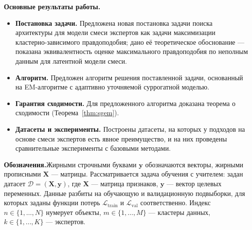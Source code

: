 \medskip
\textbf{Основные результаты работы.}
\begin{itemize}
    \item \textbf{Постановка задачи.} Предложена новая постановка задачи
    поиска архитектуры для модели смеси экспертов как задачи максимизации
    кластерно-зависимого правдоподобия; дано её теоретическое
    обоснование --- показана эквивалентность оценке максимального
    правдоподобия по неполным данным для латентной модели смеси.
    \item \textbf{Алгоритм.} Предложен алгоритм решения поставленной
    задачи, основанный на EM-алгоритме с адаптивно уточняемой
    суррогатной моделью.
    \item \textbf{Гарантия сходимости.} Для предложенного алгоритма
    доказана теорема о сходимости (Теорема~\ref{thm:sgem}).
    \item \textbf{Датасеты и эксперименты.} Построены датасеты, на
    которых у подходов на основе смеси экспертов есть явное преимущество,
    и на них проведены сравнительные эксперименты с базовыми методами.
\end{itemize}

\medskip
\textbf{Обозначения.}\quad Жирными строчными буквами $\mathbf{y}$
обозначаются векторы, жирными прописными $\mathbf{X}$ --- матрицы.
Рассматривается задача обучения с учителем: задан датасет
$\mathcal{D} = (\mathbf{X}, \mathbf{y})$, где $\mathbf{X}$ ---
матрица признаков, $\mathbf{y}$ --- вектор целевых переменных. Данные
разбиты на обучающую и валидационную подвыборки, для которых заданы
функции потерь $\mathcal{L}_{\text{train}}$ и
$\mathcal{L}_{\text{val}}$ соответственно. Индекс
$n \in \{1, \ldots, N\}$ нумерует объекты, $m \in \{1, \ldots, M\}$ ---
кластеры данных, $k \in \{1, \ldots, K\}$ --- экспертов.
